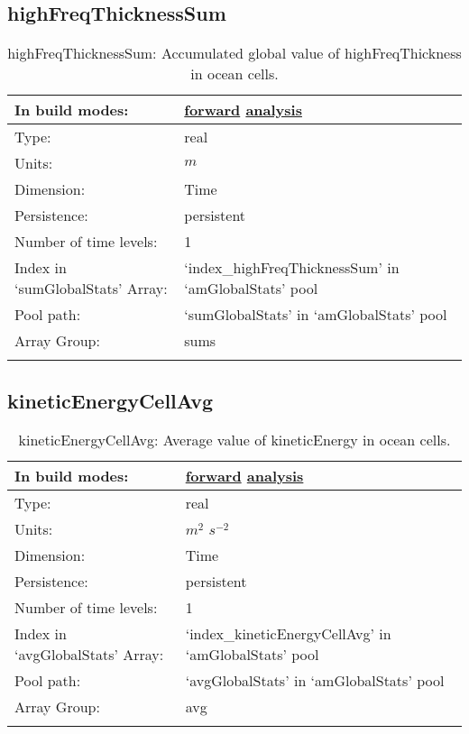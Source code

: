 \subsection[highFreqThicknessSum]{highFreqThicknessSum}
\label{subsec:var_sec_amGlobalStats_highFreqThicknessSum}
\begin{center}
\begin{longtable}{| p{2.0in} | p{4.0in} |}
        \hline 
        In build modes: & \hyperref[subsec:forward_var_tab_amGlobalStats]{forward} \hyperref[subsec:analysis_var_tab_amGlobalStats]{analysis} \\
        \hline 
        Type: & real \\
        \hline 
        Units: & $m$ \\
        \hline 
        Dimension: & Time \\
        \hline 
        Persistence: & persistent \\
        \hline 
        Number of time levels: & 1 \\
        \hline 
		 Index in `sumGlobalStats' Array: & `index\_highFreqThicknessSum' in `amGlobalStats' pool \\
		 \hline 
            Pool path: & `sumGlobalStats' in `amGlobalStats' pool \\
		 \hline 
		 Array Group: & sums \\
		 \hline 
    \caption{highFreqThicknessSum: Accumulated global value of highFreqThickness in ocean cells.}
\end{longtable}
\end{center}
\subsection[kineticEnergyCellAvg]{kineticEnergyCellAvg}
\label{subsec:var_sec_amGlobalStats_kineticEnergyCellAvg}
\begin{center}
\begin{longtable}{| p{2.0in} | p{4.0in} |}
        \hline 
        In build modes: & \hyperref[subsec:forward_var_tab_amGlobalStats]{forward} \hyperref[subsec:analysis_var_tab_amGlobalStats]{analysis} \\
        \hline 
        Type: & real \\
        \hline 
        Units: & $m^2$ $s^{-2}$ \\
        \hline 
        Dimension: & Time \\
        \hline 
        Persistence: & persistent \\
        \hline 
        Number of time levels: & 1 \\
        \hline 
		 Index in `avgGlobalStats' Array: & `index\_kineticEnergyCellAvg' in `amGlobalStats' pool \\
		 \hline 
            Pool path: & `avgGlobalStats' in `amGlobalStats' pool \\
		 \hline 
		 Array Group: & avg \\
		 \hline 
    \caption{kineticEnergyCellAvg: Average value of kineticEnergy in ocean cells.}
\end{longtable}
\end{center}
